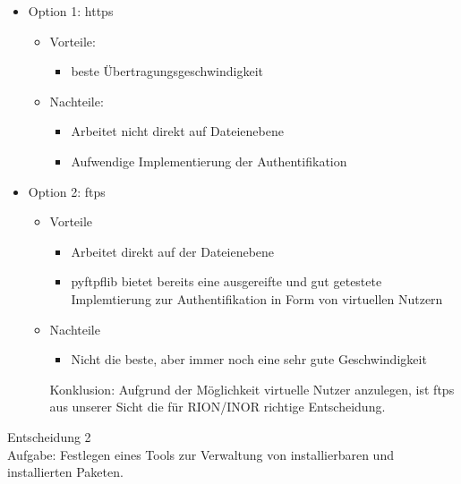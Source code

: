 \begin{itemize}
    \item Option 1: https
    \begin{itemize}
        \item Vorteile:
            \begin{itemize}
                \item beste Übertragungsgeschwindigkeit
            \end{itemize}
        \item Nachteile:
            \begin{itemize}
                \item Arbeitet nicht direkt auf Dateienebene
                \item Aufwendige Implementierung der Authentifikation
            \end{itemize}
    \end{itemize}
     \item Option 2: ftps
    \begin{itemize}
        \item Vorteile
        \begin{itemize}
        \item Arbeitet direkt auf der Dateienebene
        \item pyftpflib bietet bereits eine ausgereifte und gut getestete Implemtierung zur
Authentifikation in Form von virtuellen Nutzern
        \end{itemize}
        \item Nachteile
        \begin{itemize}
            \item Nicht die beste, aber immer noch eine sehr gute Geschwindigkeit
        \end{itemize}
        Konklusion: Aufgrund der Möglichkeit virtuelle Nutzer anzulegen, ist ftps aus unserer Sicht
die für RION/INOR richtige Entscheidung.


        
    \end{itemize}
\end{itemize}
\clearpage

Entscheidung 2 \\
Aufgabe: Festlegen eines Tools zur Verwaltung von installierbaren und installierten Paketen.

